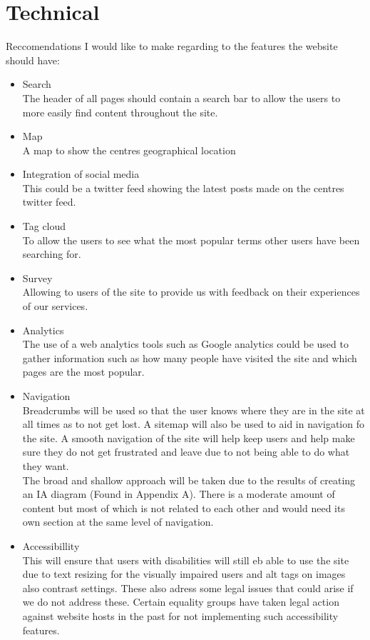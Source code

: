\documentclass{article}
\begin{document}
\section{Technical}
Reccomendations I would like to make regarding to the features the website should have:
\begin{itemize}
\item Search
\\The header of all pages should contain a search bar to allow the users to more easily find content throughout the site.

\item Map
\\A map to show the centres geographical location

\item Integration of social media
\\This could be a twitter feed showing the latest posts made on the centres twitter feed.

\item Tag cloud
\\To allow the users to see what the most popular terms other users have been searching for.

\item Survey
\\Allowing to users of the site to provide us with feedback on their experiences of our services.

\item Analytics
\\The use of a web analytics tools such as Google analytics could be used to gather information such as how many people have visited the site and which pages are the most popular.

\item Navigation
\\Breadcrumbs will be used so that the user knows where they are in the site at all times as to not get lost.  A sitemap will also be used to aid in navigation fo the site.  A smooth navigation of the site will help keep users and help make sure they do not get frustrated and leave due to not being able to do what they want.
\\The broad and shallow approach will be taken due to the results of creating an IA diagram (Found in Appendix A).  There is a moderate amount of content but most of which is not related to each other and would need its own section at the same level of navigation.

\item Accessibillity
\\This will ensure that users with disabilities will still eb able to use the site due to text resizing for the visually impaired users and alt tags on images also contrast settings.  These also adress some legal issues that could arise if we do not address these.  Certain equality groups have taken legal action against website hosts in the past for not implementing such accessibility features.


\end{itemize}
\end{document}
